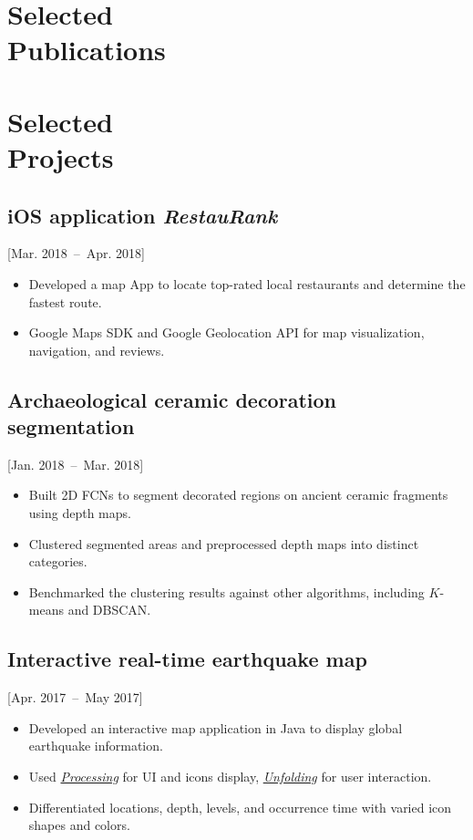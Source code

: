\documentclass{mycv}
\begin{document}
\section{Selected \\ Publications}

\vspace{-0.5em}
\section{Selected \\ Projects}

\subsection{iOS application \textit{RestauRank}}[Mar. 2018~--~Apr. 2018]

\begin{itemize}
  \itemsep 0em
  \item Developed a map App to locate top-rated local restaurants and determine the fastest route.
  \item Google Maps SDK and Google Geolocation API for map visualization, navigation, and reviews.
\end{itemize}

\subsection{Archaeological ceramic decoration segmentation}[Jan. 2018~--~Mar. 2018]

\begin{itemize}
  \itemsep 0em
    \item Built 2D FCNs to segment decorated regions on ancient ceramic fragments using depth maps.
    \item Clustered segmented areas and preprocessed depth maps into distinct categories.
    \item Benchmarked the clustering results against other algorithms, including $K$-means and DBSCAN.
\end{itemize}

\subsection{Interactive real-time earthquake map}[Apr. 2017~--~May 2017]

\begin{itemize}
  \item Developed an interactive map application in Java to display global earthquake information.
  \item Used \href{https://processing.org/}{\emph{Processing}} for UI and icons display, \href{http://unfoldingmaps.org/}{\emph{Unfolding}} for user interaction.
  \item Differentiated locations, depth, levels, and occurrence time with varied icon shapes and colors.
\end{itemize}
\end{document}
